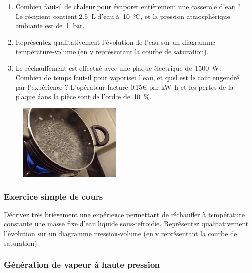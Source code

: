 	\begin{enumerate}
		\item Combien faut-il de chaleur pour évaporer entièrement une casserole d’eau ? Le récipient contient \SI{2.5}{\liter} d’eau à~\SI{10}{\degreeCelsius}, et la pression atmosphérique ambiante est de~\SI{1}{\bar}. 
		\item Représentez qualitativement l’évolution de l’eau sur un diagramme température-volume (en y représentant la courbe de saturation).
		\item Le réchauffement est effectué avec une plaque électrique de~\SI{1500}{\watt}. Combien de temps faut-il pour vaporiser l’eau, et quel est le coût engendré par l’expérience ? L’opérateur facture \num{0,15}\euro{} par \si{\kilo\watt\hour} et les pertes de la plaque dans la pièce sont de l’ordre de~\SI{10}{\percent}. 
	\end{enumerate}

	\begin{figure}[htp] %
		\begin{center}
			\includegraphics[width=5cm]{images/exercice_boiling.jpg}
		\end{center}
	\end{figure}


\subsubsection{Exercice simple de cours}
\label{exo_cours_vapeur_isotherme}

	Décrivez très brièvement une expérience permettant de réchauffer à température constante une masse fixe d’eau liquide sous-refroidie. Représentez qualitativement l’évolution sur un diagramme pression-volume (en y représentant la courbe de saturation).


\subsubsection{Génération de vapeur à haute pression}
\label{exo_generation_vapeur}

